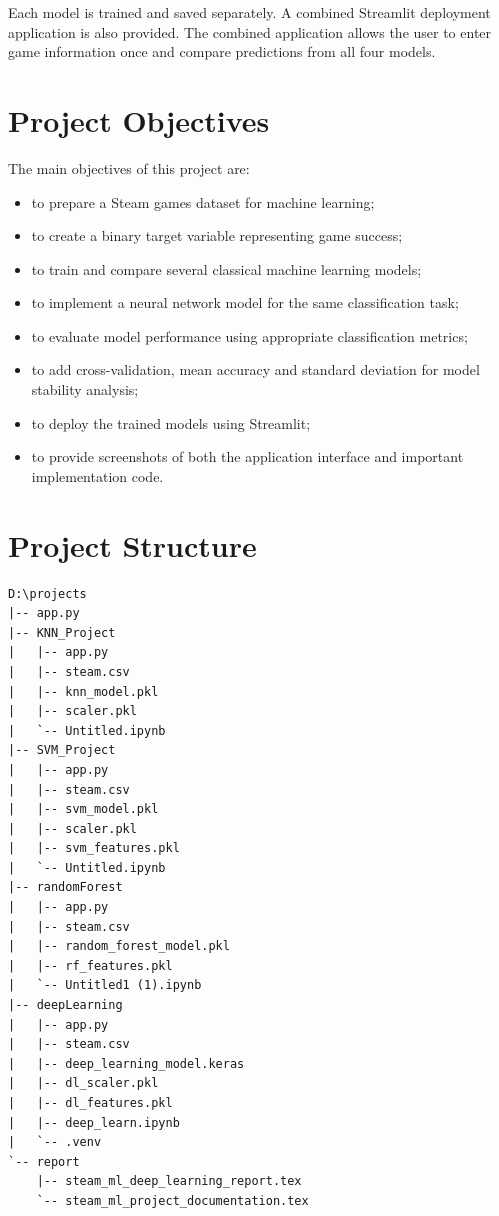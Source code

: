\documentclass[12pt,a4paper]{article}
\begin{document}
Each model is trained and saved separately. A combined Streamlit deployment application is also provided. The combined application allows the user to enter game information once and compare predictions from all four models.

\section{Project Objectives}

The main objectives of this project are:

\begin{itemize}[noitemsep]
    \item to prepare a Steam games dataset for machine learning;
    \item to create a binary target variable representing game success;
    \item to train and compare several classical machine learning models;
    \item to implement a neural network model for the same classification task;
    \item to evaluate model performance using appropriate classification metrics;
    \item to add cross-validation, mean accuracy and standard deviation for model stability analysis;
    \item to deploy the trained models using Streamlit;
    \item to provide screenshots of both the application interface and important implementation code.
\end{itemize}

\section{Project Structure}

\begin{lstlisting}
D:\projects
|-- app.py
|-- KNN_Project
|   |-- app.py
|   |-- steam.csv
|   |-- knn_model.pkl
|   |-- scaler.pkl
|   `-- Untitled.ipynb
|-- SVM_Project
|   |-- app.py
|   |-- steam.csv
|   |-- svm_model.pkl
|   |-- scaler.pkl
|   |-- svm_features.pkl
|   `-- Untitled.ipynb
|-- randomForest
|   |-- app.py
|   |-- steam.csv
|   |-- random_forest_model.pkl
|   |-- rf_features.pkl
|   `-- Untitled1 (1).ipynb
|-- deepLearning
|   |-- app.py
|   |-- steam.csv
|   |-- deep_learning_model.keras
|   |-- dl_scaler.pkl
|   |-- dl_features.pkl
|   |-- deep_learn.ipynb
|   `-- .venv
`-- report
    |-- steam_ml_deep_learning_report.tex
    `-- steam_ml_project_documentation.tex
\end{lstlisting}
\end{document}
